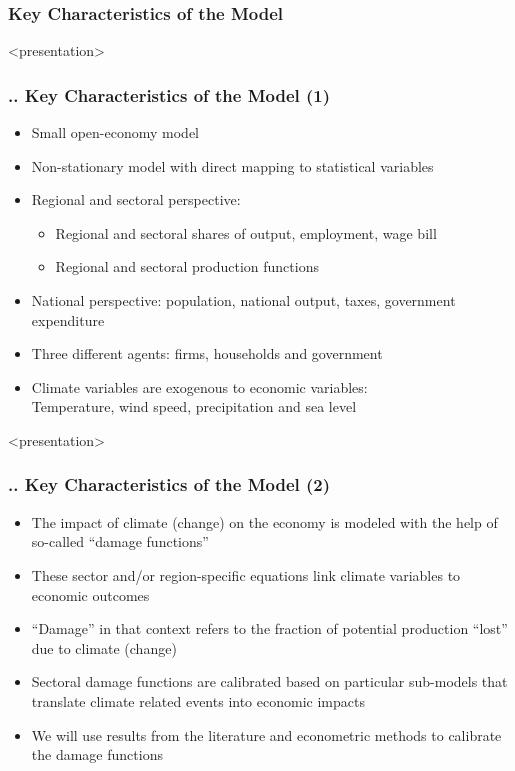 \documentclass[11pt,aspectratio=169]{beamer}
\begin{document}
\subsubsection{Key Characteristics of the Model}
\begin{frame}<presentation>
	\frametitle{{\thesection.\thesubsection.\thesubsubsection} Key Characteristics of the Model (1)}
	\begin{itemize}
		
	\item Small open-economy model
	\item Non-stationary model with direct mapping to statistical variables
	\item Regional and sectoral perspective:
	\begin{itemize}
	\item	Regional and sectoral shares of output, employment, wage bill
	\item	Regional and sectoral production functions
	\end{itemize}
	\item National perspective:	population, national output, taxes, government expenditure
	\item	Three different agents: firms, households and government
	\item	Climate variables are exogenous to economic variables:\\
	{\small{Temperature, wind speed, precipitation and sea level}}
		
	\end{itemize}
\end{frame}

   
   
   \begin{frame}<presentation>
   	\frametitle{{\thesection.\thesubsection.\thesubsubsection} Key Characteristics of the Model (2)}
   	  	\begin{itemize}
   		
   		\item The impact of climate (change) on the economy is modeled with the help of so-called ``damage functions''
   		\item These sector and/or region-specific equations link climate variables to economic outcomes 
			\item ``Damage'' in that context refers to the fraction of potential production ``lost'' due to climate (change)  
   		\item Sectoral damage functions are calibrated based on particular sub-models that translate climate related events into economic impacts
   		\item We will use results from the literature and econometric methods to calibrate the damage functions
   	\end{itemize}
   \end{frame}
\end{document}
